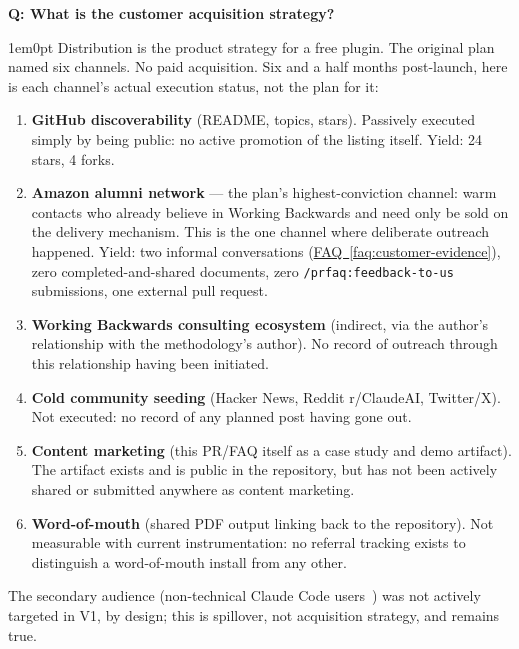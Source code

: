 \documentclass[11pt,letterpaper]{article}
\newcounter{faqnum}
\newenvironment{faqpair}[1]{%
  \needspace{4\baselineskip}%
  \vspace{0.5em}%
  \refstepcounter{faqnum}%
  \noindent\textbf{\color{SectionBlue}Q\thefaqnum: #1}\par\nopagebreak[4]%
  \vspace{0.2em}%
  \begin{adjustwidth}{1em}{0pt}%
  \setlength{\parindent}{0pt}%
}{%
  \end{adjustwidth}%
  \vspace{0.5em}%
}
\newcommand{\faqref}[1]{\hyperref[#1]{FAQ~\ref*{#1}}}
\begin{document}
\begin{faqpair}{What is the customer acquisition strategy?}\label{faq:acquisition}
  Distribution is the product strategy for a free plugin. The original plan named six channels. No paid acquisition. Six and a half months post-launch, here is each channel's actual execution status, not the plan for it:

  \begin{enumerate}[nosep]
    \item[(1)] \textbf{GitHub discoverability} (README, topics, stars). Passively executed simply by being public: no active promotion of the listing itself. Yield: 24 stars, 4 forks.
    \item[(2)] \textbf{Amazon alumni network} --- the plan's highest-conviction channel: warm contacts who already believe in Working Backwards and need only be sold on the delivery mechanism. This is the one channel where deliberate outreach happened. Yield: two informal conversations (\faqref{faq:customer-evidence}), zero completed-and-shared documents, zero \texttt{/prfaq:feedback-to-us} submissions, one external pull request.
    \item[(3)] \textbf{Working Backwards consulting ecosystem} (indirect, via the author's relationship with the methodology's author). No record of outreach through this relationship having been initiated.
    \item[(4)] \textbf{Cold community seeding} (Hacker News, Reddit r/ClaudeAI, Twitter/X). Not executed: no record of any planned post having gone out.
    \item[(5)] \textbf{Content marketing} (this PR/FAQ itself as a case study and demo artifact). The artifact exists and is public in the repository, but has not been actively shared or submitted anywhere as content marketing.
    \item[(6)] \textbf{Word-of-mouth} (shared PDF output linking back to the repository). Not measurable with current instrumentation: no referral tracking exists to distinguish a word-of-mouth install from any other.
  \end{enumerate}

  The secondary audience (non-technical Claude Code users~\cite{nyt2026claudecode}) was not actively targeted in V1, by design; this is spillover, not acquisition strategy, and remains true.


\end{faqpair}
\end{document}
